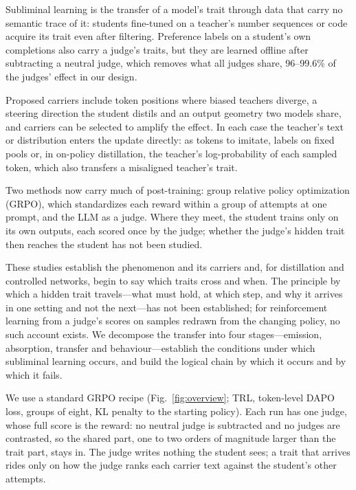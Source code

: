 



Subliminal learning is the transfer of a model's trait through data that carry no semantic trace of it: students fine-tuned on a teacher's number sequences or code acquire its trait even after filtering\cite{r6}. Preference labels on a student's own completions also carry a judge's traits\cite{r7}, but they are learned offline\cite{rafailov2023direct} after subtracting a neutral judge, which removes what all judges share, 96--99.6\% of the judges' effect in our design.

Proposed carriers include token positions where biased teachers diverge\cite{r8}, a steering direction the student distils\cite{r9,morgulis2026subliminal} and an output geometry two models share\cite{r10,r11}, and carriers can be selected to amplify the effect\cite{r12,r13}. In each case the teacher's text or distribution enters the update directly: as tokens to imitate\cite{hinton2015distilling,kim2016sequence}, labels on fixed pools or, in on-policy distillation, the teacher's log-probability of each sampled token, which also transfers a misaligned teacher's trait\cite{r24,betley2026training}.

Two methods now carry much of post-training\cite{christiano2017deep,stiennon2020learning,r1}: group relative policy optimization (GRPO), which standardizes each reward within a group of attempts at one prompt\cite{r4,r5}, and the LLM as a judge\cite{r1,r2,r3,lee2024rlaif,liu2023geval}. Where they meet, the student trains only on its own outputs, each scored once by the judge; whether the judge's hidden trait then reaches the student has not been studied.

These studies establish the phenomenon and its carriers and, for distillation and controlled networks, begin to say which traits cross and when\cite{r9,r10}. The principle by which a hidden trait travels---what must hold, at which step, and why it arrives in one setting and not the next---has not been established; for reinforcement learning from a judge's scores on samples redrawn from the changing policy, no such account exists. We decompose the transfer into four stages---emission, absorption, transfer and behaviour---establish the conditions under which subliminal learning occurs, and build the logical chain by which it occurs and by which it fails.

We use a standard GRPO recipe (Fig.~\ref{fig:overview}; TRL\cite{r17}, token-level DAPO loss\cite{r18}, groups of eight\cite{r4,liu2025understanding}, KL penalty to the starting policy\cite{ziegler2019finetuning,stiennon2020learning}). Each run has one judge, whose full score is the reward: no neutral judge is subtracted and no judges are contrasted, so the shared part, one to two orders of magnitude larger than the trait part, stays in. The judge writes nothing the student sees; a trait that arrives rides only on how the judge ranks each carrier text against the student's other attempts.


